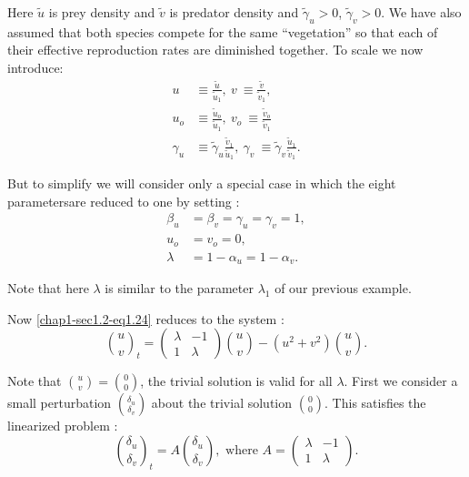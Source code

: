 Here $\tilde{u}$ is prey density and $\tilde{v}$ is predator density
and $\tilde{\gamma}_{u} > 0$, $\tilde{\gamma}_{v} > 0$.  
We have also assumed that both species compete for the same
``vegetation'' so that each of their effective reproduction rates are
diminished together. To scale we now introduce: 
\begin{equation*}
\begin{split}
u & \equiv \frac{\tilde{u}}{\tilde{u}_{1}} ,~ v ~\equiv
\frac{\tilde{v}}{\tilde{v}_{1}},\\
u_{o} & \equiv \frac{\tilde{u}_{o}}{\tilde{u}_{1}} ,~ v_{o} ~\equiv
\frac{\tilde{v}_{o}}{\tilde{v}_{1}}\\  
\gamma_{u} & \equiv  \tilde{\gamma}_{u}
\frac{\tilde{v}_{1}}{\tilde{u}_{1}} ,~ \gamma_{v} ~\equiv
\tilde{\gamma}_{v} \frac{\tilde{u}_{1}}{\tilde{v}_{1}}.  
\end{split}\tag{1.23}\label{chap1-sec1.2-eq1.23}
\end{equation*}

But to simplify we will consider only a special case in which the
eight parameters\pageoriginale  are reduced to one by setting : 
\begin{equation*}
\begin{split}
\beta_{u} & = \beta_{v} = \gamma_{u} = \gamma_{v} = 1,\\
u_{o} & = v_{o} = 0,\\
\lambda & = 1 - \alpha_{u} = 1 - \alpha_{v}. 
 \end{split}\tag{1.24}\label{chap1-sec1.2-eq1.24}
\end{equation*}

 Note that here $\lambda$ is similar to the parameter $\lambda_{1}$ of
 our previous example.  
 
 Now \eqref{chap1-sec1.2-eq1.24} reduces to the system : 
  \begin{equation*}
\binom{u}{v}_{t} = 
\begin{pmatrix}
\lambda & - 1\\ 
1 & \lambda
\end{pmatrix}
 \binom{u}{v} - (u^{2} +
    v^{2}) \binom{u}{v}. \tag{1.25} \label{chap1-sec1.2-eq1.25}
 \end{equation*} 
 
 Note that $\binom{u}{v} = \binom{0}{0}$, the trivial solution is
 valid for all  $\lambda$. First we consider a small perturbation
 $\binom{\delta_u}{\delta_v}$ about the trivial solution
 $\binom{0}{0}$. This 
 satisfies the linearized problem : 
 \begin{equation*}
\binom{\delta_u}{\delta_v}_{t} = A\binom{\delta_u}{\delta_v},
   \text{ \ where \ } A = \begin{pmatrix}\lambda & -1\\  1 &
     \lambda
   \end{pmatrix}. \tag{1.26} \label{chap1-sec1.2-eq1.26} 
 \end{equation*} 

